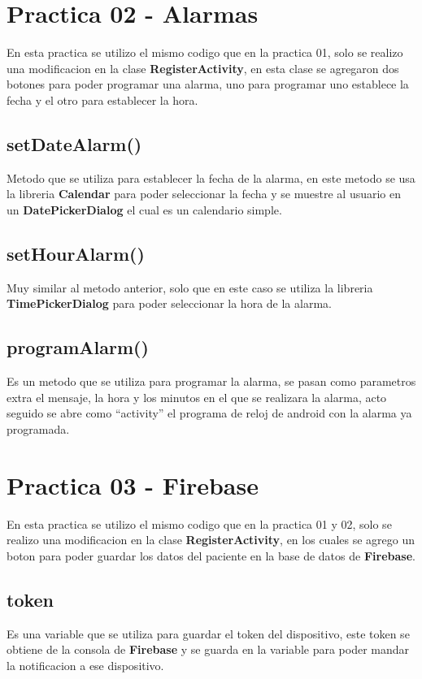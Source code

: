 \documentclass{article}
\begin{document}
\section{Practica 02 - Alarmas}
En esta practica se utilizo el mismo codigo que en la practica 01, solo se
realizo una modificacion en la clase \textbf{RegisterActivity}, en esta clase
se agregaron dos botones para poder programar una alarma, uno para programar
uno establece la fecha y el otro para establecer la hora.

\subsection{setDateAlarm()}
Metodo que se utiliza para establecer la fecha de la alarma, en este metodo
se usa la libreria \textbf{Calendar} para poder seleccionar la fecha y se
muestre al usuario en un \textbf{DatePickerDialog} el cual es un calendario
simple.

\subsection{setHourAlarm()}
Muy similar al metodo anterior, solo que en este caso se utiliza la libreria
\textbf{TimePickerDialog} para poder seleccionar la hora de la alarma.

\subsection{programAlarm()}
Es un metodo que se utiliza para programar la alarma, se pasan como parametros
extra el mensaje, la hora y los minutos en el que se realizara la alarma,
acto seguido se abre como ``activity'' el programa de reloj de android con
la alarma ya programada.

\section{Practica 03 - Firebase}
En esta practica se utilizo el mismo codigo que en la practica 01 y 02, solo se
realizo una modificacion en la clase \textbf{RegisterActivity}, en los cuales
se agrego un boton para poder guardar los datos del paciente en la base de datos
de \textbf{Firebase}.

\subsection{token}
Es una variable que se utiliza para guardar el token del dispositivo, este token
se obtiene de la consola de \textbf{Firebase} y se guarda en la variable para
poder mandar la notificacion a ese dispositivo.
\end{document}
